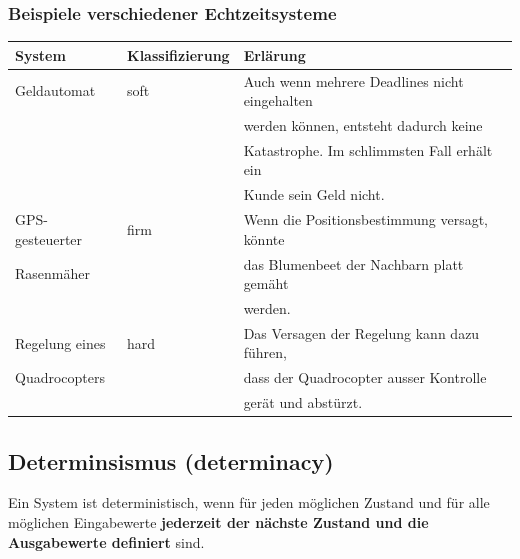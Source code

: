 \subsubsection{Beispiele verschiedener Echtzeitsysteme}

\begin{center}
    \begin{tabular}{@{}lll@{}}
        \toprule
        \textbf{System}     & \textbf{Klassifizierung}  & \textbf{Erlärung}                             \\
        \midrule
        Geldautomat         & soft                      & Auch wenn mehrere Deadlines nicht eingehalten \\
                            &                           & werden können, entsteht dadurch keine         \\
                            &                           & Katastrophe. Im schlimmsten Fall erhält ein   \\
                            &                           & Kunde sein Geld nicht.                        \\
        \midrule
        GPS-gesteuerter     & firm                      & Wenn die Positionsbestimmung versagt, könnte  \\
        Rasenmäher          &                           & das Blumenbeet der Nachbarn platt gemäht      \\
                            &                           & werden.                                       \\
        \midrule
        Regelung eines      & hard                      & Das Versagen der Regelung kann dazu führen,   \\
        Quadrocopters       &                           & dass der Quadrocopter ausser Kontrolle        \\
                            &                           & gerät und abstürzt.                           \\
        \bottomrule
    \end{tabular}
\end{center}


\subsection{Determinsismus (determinacy)}

Ein System ist deterministisch, wenn für jeden möglichen Zustand und für alle möglichen Eingabewerte
\textbf{jederzeit der nächste Zustand und die Ausgabewerte definiert} sind.

